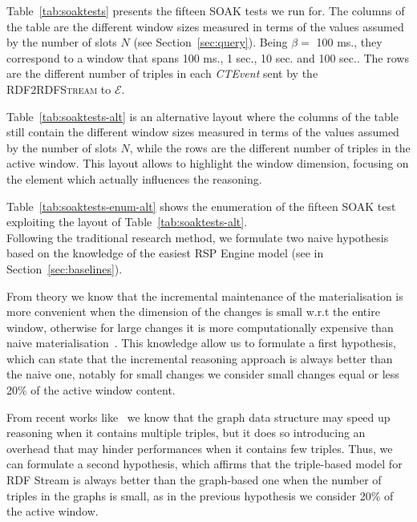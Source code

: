 Table~\ref{tab:soaktests} presents the fifteen SOAK tests we run for. The columns of the table are the different window sizes measured in terms of the values assumed by the number of slots $N$ (see Section~\ref{sec:query}).  Being $\beta=$ 100 ms., they correspond to a window that spans 100 ms., 1 sec., 10 sec. and 100 sec.. The rows are the different number of triples in each \textit{CTEvent} sent by the \textsc{RDF2RDFStream} to $\mathcal{E}$.%

Table~\ref{tab:soaktests-alt} is an alternative layout where the columns of the table still contain the different window sizes measured in terms of the values assumed by the number of slots $N$, while the rows are the different number of triples in the active window. This layout allows to highlight the window dimension, focusing on the element which actually influences the reasoning.

Table~\ref{tab:soaktests-enum-alt} shows the enumeration of the fifteen SOAK test exploiting the layout of Table~\ref{tab:soaktests-alt}.\\

\noindent Following the traditional research method, we formulate two naive hypothesis based on the knowledge of the easiest RSP Engine model (see in Section~\ref{sec:baselines}). 

From theory we know that the incremental maintenance of the materialisation is more convenient when the dimension of the changes is small w.r.t the entire window, otherwise  for large changes it is more computationally expensive than naive materialisation~\cite{DellAglio2014,DBLP:conf/cikm/RenP11,DBLP:conf/semweb/UrbaniMJHB13}.
This knowledge allow us to formulate a first hypothesis, which can state that the incremental reasoning approach is always better than the naive one, notably for small changes we consider small changes equal or less 20\% of the active window content.

From recent works like~\cite{DBLP:conf/semweb/BalduiniVDTPC13} we know that the graph data structure may speed up reasoning when it contains multiple triples, but it does so introducing an overhead that may hinder performances when it contains few triples. Thus, we can formulate a second hypothesis, which affirms that the triple-based model for RDF Stream is always better than the graph-based one when the number of triples in the graphs is small, as in the previous hypothesis we consider 20\% of the active window.\\


